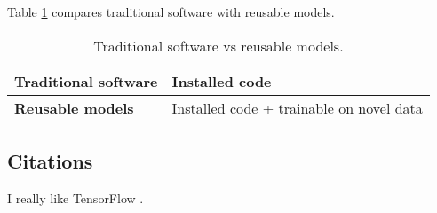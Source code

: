 \documentclass{article}
\begin{document}
Table \ref{software-vs-models} compares traditional software with
reusable models.

\begin{table}[h!]
  \begin{center}
    \caption{Traditional software vs reusable models.}
    \label{software-vs-models}
    \begin{small}
      \begin{tabular}{l|l}
        \toprule
        \textbf{Traditional software} & Installed code \\ \hline
        \textbf{Reusable models} & Installed code + trainable on novel data \\
        \bottomrule
      \end{tabular}
    \end{small}
  \end{center}
\end{table}

\subsection{Citations}

I really like TensorFlow \cite{tensorflow2015-whitepaper}.



\end{document}
